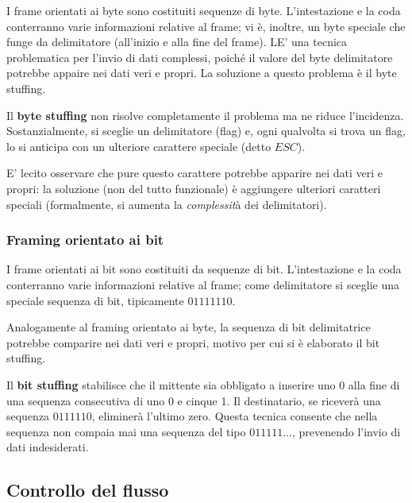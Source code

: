             I frame orientati ai byte sono costituiti sequenze di byte. L'intestazione e la coda conterranno varie informazioni relative al frame; vi è, inoltre, un byte speciale che funge da delimitatore (all'inizio e alla fine del frame). LE' una tecnica problematica per l'invio di dati complessi, poiché il valore del byte delimitatore potrebbe appaire nei dati veri e propri. La soluzione a questo problema è il byte stuffing.
            
            \vspace{3mm}
            
            Il \textbf{byte stuffing} non risolve completamente il problema ma ne riduce l'incidenza. Sostanzialmente, si sceglie un delimitatore (flag) e, ogni qualvolta si trova un flag, lo si anticipa con un ulteriore carattere speciale (detto $ESC$). 
            
            E' lecito osservare che pure questo carattere potrebbe apparire nei dati veri e propri: la soluzione (non del tutto funzionale) è aggiungere ulteriori caratteri speciali (formalmente, si aumenta la \textit{complessit}à dei delimitatori).
        
        \subsubsection{Framing orientato ai bit}
        
            I frame orientati ai bit sono costituiti da sequenze di bit. L'intestazione e la coda conterranno varie informazioni relative al frame; come delimitatore si sceglie una speciale sequenza di bit, tipicamente $01111110$.
            
            Analogamente al framing orientato ai byte, la sequenza di bit delimitatrice potrebbe comparire nei dati veri e propri, motivo per cui si è elaborato il bit stuffing.
            
            \vspace{3mm}
            
            Il \textbf{bit stuffing} stabilisce che il mittente sia obbligato a inserire uno 0 alla fine di una sequenza consecutiva di uno 0 e cinque 1. Il destinatario, se riceverà una sequenza $0111110$, eliminerà l'ultimo zero. Questa tecnica consente che nella sequenza non compaia mai una sequenza del tipo $011111...$, prevenendo l'invio di dati indesiderati.
            
    \subsection{Controllo del flusso}
    

